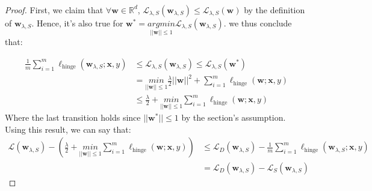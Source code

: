 \subsubsection{}
\begin{proof}
    First, we claim that $\forall \boldsymbol{w} \in \mathbb{R}^d$, $\mathcal{L}_{\lambda, S}(\boldsymbol{w}_{\lambda, S}) \leq \mathcal{L}_{\lambda, S}(\boldsymbol{w})$ by the definition of $\boldsymbol{w}_{\lambda, S}$. Hence, it's also true for $\boldsymbol{w}^* = \underset{||\boldsymbol{w}||\leq 1}{argmin} \mathcal{L}_{\lambda, S}(\boldsymbol{w}_{\lambda, S})$. we thus conclude that:

    \begin{equation*}
        \begin{split}            
            \frac{1}{m} \sum_{i=1}^m \ell_{\text{hinge}}(\boldsymbol{w}_{\lambda, S}; \boldsymbol{x}, y) 
            &\leq \mathcal{L}_{\lambda, S}(\boldsymbol{w}_{\lambda, S}) 
            \leq \mathcal{L}_{\lambda, S}(\boldsymbol{w}^*) \\
            &= \underset{||\boldsymbol{w}||\leq 1}{min} \frac{\lambda}{2} ||\boldsymbol{w}||^2 + \sum_{i=1}^m \ell_{\text{hinge}}(\boldsymbol{w}; \boldsymbol{x}, y) \\
            &\leq \frac{\lambda}{2} + \underset{||\boldsymbol{w}||\leq 1}{min} \sum_{i=1}^m \ell_{\text{hinge}}(\boldsymbol{w}; \boldsymbol{x}, y)
        \end{split}
    \end{equation*}
    Where the last transition holds since $||\boldsymbol{w}^*|| \leq 1$ by the section's assumption. Using this result, we can say that:
    \begin{equation*}
        \begin{split}            
            \mathcal{L}(\boldsymbol{w}_{\lambda, S}) - \left(\frac{\lambda}{2} + \underset{||\boldsymbol{w}||\leq 1}{min} \sum_{i=1}^m \ell_{\text{hinge}}(\boldsymbol{w}; \boldsymbol{x}, y)\right) 
            &\leq \mathcal{L}_D(\boldsymbol{w}_{\lambda, S}) - \frac{1}{m} \sum_{i=1}^m \ell_{\text{hinge}}(\boldsymbol{w}_{\lambda, S}; \boldsymbol{x}, y) \\
            &= \mathcal{L}_D(\boldsymbol{w}_{\lambda, S}) - \mathcal{L}_S(\boldsymbol{w}_{\lambda, S})
        \end{split}
    \end{equation*}


\end{proof}

